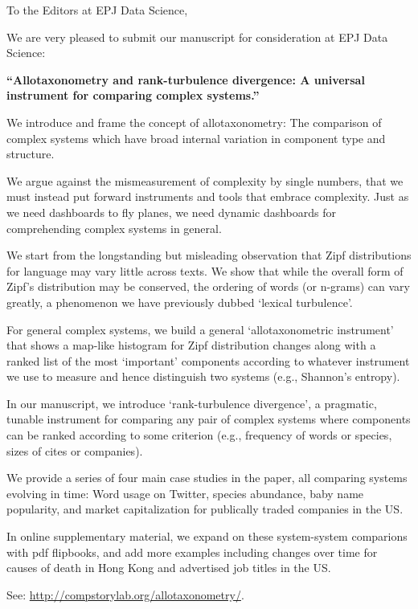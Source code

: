 
To the Editors at EPJ Data Science,

We are very pleased to submit our manuscript for consideration at
EPJ Data Science:

\textbf{``Allotaxonometry and rank-turbulence divergence: A universal instrument for comparing complex systems.''}

We introduce and frame the concept of allotaxonometry:
The comparison of complex systems which have broad
internal variation in component type and structure.

We argue against the mismeasurement of complexity by single
numbers, that we must instead put forward instruments and tools
that embrace complexity.
Just as we need dashboards to fly planes,
we need dynamic dashboards for comprehending complex systems in general.

We start from the longstanding but misleading observation that Zipf distributions
for language may vary little across texts.
We show that while the overall form of Zipf's distribution may be conserved,
the ordering of words (or n-grams) can vary greatly, a phenomenon we have
previously dubbed `lexical turbulence'.

For general complex systems,
we build a general `allotaxonometric instrument' that shows a map-like
histogram for Zipf distribution changes along with a ranked list
of the most `important' components according to whatever instrument
we use to measure and hence distinguish two systems (e.g., Shannon's entropy).

In our manuscript, we introduce `rank-turbulence divergence', a pragmatic, tunable
instrument for comparing any pair of complex systems where components can
be ranked according to some criterion
(e.g., frequency of words or species, sizes of cites or companies).

We provide a series of four main case studies in the paper, all comparing
systems evolving in time:
Word usage on Twitter,
species abundance,
baby name popularity,
and
market capitalization for publically traded companies in the US.

In online supplementary material, we expand on these
system-system comparions
with pdf flipbooks, and add more examples including
changes over time for causes of death in Hong Kong
and advertised job titles in the US.

See: \url{http://compstorylab.org/allotaxonometry/}.

